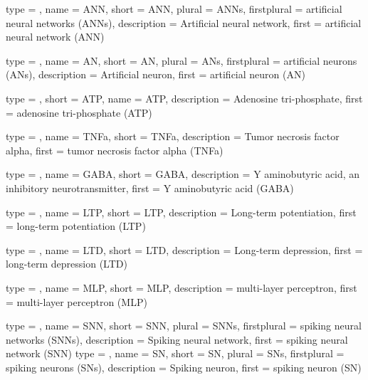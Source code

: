 %
%
%


{
	type        = \acronymtype,
	name        = {ANN},
	short       = {ANN},
	plural      = ANNs,
	firstplural = artificial neural networks (ANNs),
	description = {Artificial neural network},
	first       = {artificial neural network (ANN)}
}

{
	type        = \acronymtype,
	name        = {AN},
	short       = {AN},
	plural      = ANs,
	firstplural = artificial neurons (ANs),
	description = {Artificial neuron},
	first       = {artificial neuron (AN)}
}

{
	type        = \acronymtype,
	short       = {ATP},
  	name        = {ATP},
	description = {Adenosine tri-phosphate},
	first       = {adenosine tri-phosphate (ATP)}
}

{
	type        = \acronymtype,
   	name        = {TNFa},
	short       = {TNFa},
	description = {Tumor necrosis factor alpha},
	first       = {tumor necrosis factor alpha (TNFa)}
}

{
    type        = \acronymtype,
	name        = {GABA},
  	short       = {GABA},
	description = {Y aminobutyric acid, an inhibitory neurotransmitter},
	first       = {Y aminobutyric acid (GABA)}
}

{
	type        = \acronymtype,
	name        = {LTP},
	short       = {LTP},
	description = {Long-term potentiation},
	first       = {long-term potentiation (LTP)}
}

{
	type        = \acronymtype,
	name        = {LTD},
	short       = {LTD},
	description = {Long-term depression},
	first       = {long-term depression (LTD)}
}

{
	type        = \acronymtype,
	name        = {MLP},
	short       = {MLP},
	description = {multi-layer perceptron},
	first       = {multi-layer perceptron (MLP)}
}

{
	type        = \acronymtype,
	name        = {SNN},
	short       = {SNN},
	plural      = SNNs,
	firstplural = spiking neural networks (SNNs),
	description = {Spiking neural network},
	first       = {spiking neural network (SNN)}
}
{
	type        = \acronymtype,
	name        = {SN},
	short       = {SN},
	plural      = SNs,
	firstplural = spiking neurons (SNs),
	description = {Spiking neuron},
	first       = {spiking neuron (SN)}
}

